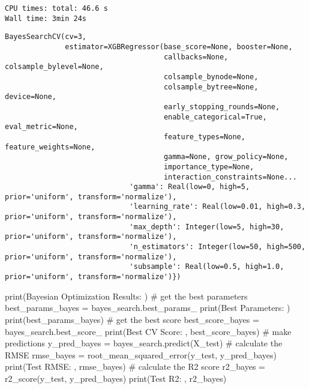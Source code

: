 \documentclass[
  letterpaper,
  DIV=11,
  numbers=noendperiod]{scrreprt}
\newenvironment{Shaded}{\begin{snugshade}}{\end{snugshade}}
\newcommand{\BuiltInTok}[1]{\textcolor[rgb]{0.00,0.23,0.31}{#1}}
\newcommand{\CommentTok}[1]{\textcolor[rgb]{0.37,0.37,0.37}{#1}}
\newcommand{\NormalTok}[1]{\textcolor[rgb]{0.00,0.23,0.31}{#1}}
\newcommand{\OperatorTok}[1]{\textcolor[rgb]{0.37,0.37,0.37}{#1}}
\newcommand{\StringTok}[1]{\textcolor[rgb]{0.13,0.47,0.30}{#1}}
\begin{document}
\begin{verbatim}
CPU times: total: 46.6 s
Wall time: 3min 24s
\end{verbatim}

\begin{verbatim}
BayesSearchCV(cv=3,
              estimator=XGBRegressor(base_score=None, booster=None,
                                     callbacks=None, colsample_bylevel=None,
                                     colsample_bynode=None,
                                     colsample_bytree=None, device=None,
                                     early_stopping_rounds=None,
                                     enable_categorical=True, eval_metric=None,
                                     feature_types=None, feature_weights=None,
                                     gamma=None, grow_policy=None,
                                     importance_type=None,
                                     interaction_constraints=None...
                             'gamma': Real(low=0, high=5, prior='uniform', transform='normalize'),
                             'learning_rate': Real(low=0.01, high=0.3, prior='uniform', transform='normalize'),
                             'max_depth': Integer(low=5, high=30, prior='uniform', transform='normalize'),
                             'n_estimators': Integer(low=50, high=500, prior='uniform', transform='normalize'),
                             'subsample': Real(low=0.5, high=1.0, prior='uniform', transform='normalize')})
\end{verbatim}

\begin{Shaded}
\begin{Highlighting}[]
\BuiltInTok{print}\NormalTok{(}\StringTok{\textquotesingle{}Bayesian Optimization Results: \textquotesingle{}}\NormalTok{)}
\CommentTok{\# get the best parameters}
\NormalTok{best\_params\_bayes }\OperatorTok{=}\NormalTok{ bayes\_search.best\_params\_}
\BuiltInTok{print}\NormalTok{(}\StringTok{\textquotesingle{}Best Parameters: \textquotesingle{}}\NormalTok{)}
\BuiltInTok{print}\NormalTok{(best\_params\_bayes)}
\CommentTok{\# get the best score}
\NormalTok{best\_score\_bayes }\OperatorTok{=}\NormalTok{ bayes\_search.best\_score\_}
\BuiltInTok{print}\NormalTok{(}\StringTok{\textquotesingle{}Best CV Score: \textquotesingle{}}\NormalTok{, best\_score\_bayes)}
\CommentTok{\# make predictions}
\NormalTok{y\_pred\_bayes }\OperatorTok{=}\NormalTok{ bayes\_search.predict(X\_test)}
\CommentTok{\# calculate the RMSE}
\NormalTok{rmse\_bayes }\OperatorTok{=}\NormalTok{ root\_mean\_squared\_error(y\_test, y\_pred\_bayes)}
\BuiltInTok{print}\NormalTok{(}\StringTok{\textquotesingle{}Test RMSE: \textquotesingle{}}\NormalTok{, rmse\_bayes)}
\CommentTok{\# calculate the R2 score}
\NormalTok{r2\_bayes }\OperatorTok{=}\NormalTok{ r2\_score(y\_test, y\_pred\_bayes)}
\BuiltInTok{print}\NormalTok{(}\StringTok{\textquotesingle{}Test R2: \textquotesingle{}}\NormalTok{, r2\_bayes)}
\end{Highlighting}
\end{Shaded}
\end{document}
